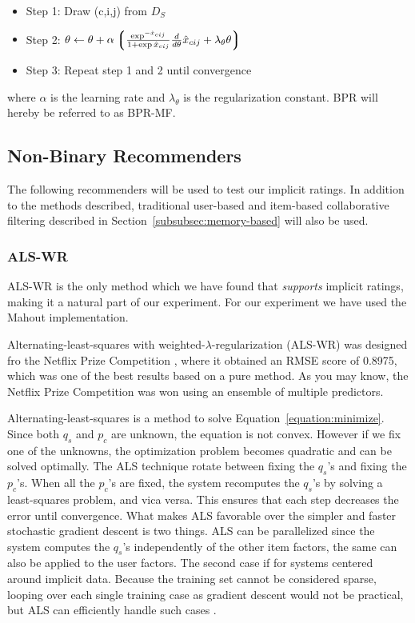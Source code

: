 \begin{itemize}
\item Step 1: Draw (c,i,j) from $D_S$
\item Step 2: $\theta \leftarrow \theta + \alpha \left\lgroup \frac{\exp^{-\hat{x}_{cij}}}{1+\exp{\hat{x}_{cij}}}  \frac{d}{d \theta} \hat{x}_{cij} + \lambda_{\theta} \theta \right\rgroup$
\item Step 3: Repeat step 1 and 2 until convergence
\end{itemize}

where $\alpha$ is the learning rate and $\lambda_{\theta}$ is the regularization constant. BPR will hereby be
referred to as BPR-MF.

\subsection{Non-Binary Recommenders}

The following recommenders will be used to test our implicit ratings. In addition to the methods described,
traditional user-based and item-based collaborative filtering described in Section~\ref{subsubsec:memory-based} will
also be used.

\subsubsection{ALS-WR}


ALS-WR is the only method which we have found that \emph{supports} implicit ratings, making
it a natural part of our experiment. For our experiment we have used the Mahout \cite{mahout} implementation.

Alternating-least-squares with weighted-$\lambda$-regularization (ALS-WR) was designed fro the Netflix Prize
Competition \cite{Netflix}, where it obtained an RMSE score of 0.8975, which was one of the best results based
on a pure method. As you may know, the Netflix Prize Competition was won using an ensemble of multiple predictors.

Alternating-least-squares is a method to solve Equation~\ref{equation:minimize}. Since both $q_{s}$ and $p_{c}$
are unknown, the equation is not convex. However if we fix one of the unknowns, the optimization problem becomes
quadratic and can be solved optimally. The ALS technique rotate between fixing the $q_{s}$'s and fixing the $p_{c}$'s.
When all the $p_{c}$'s are fixed, the system recomputes the $q_{s}$'s by solving a least-squares problem, and vica versa.
This ensures that each step decreases the error until convergence. What makes ALS favorable over the simpler and faster
stochastic gradient descent is two things. ALS can be parallelized since the system computes the $q_{s}$'s independently
of the other item factors, the same can also be applied to the user factors. The second case if for systems centered around
implicit data. Because the training set cannot be considered sparse, looping over each single training case as gradient descent
would not be practical, but ALS can efficiently handle such cases \cite{Hu2008}.\newline

